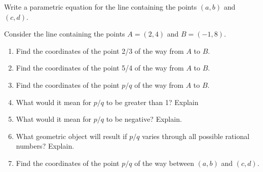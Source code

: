 \begin{prob} Write a parametric equation for the line containing the points $(a,b)$ and $(c,d)$.  

\end{prob}
\begin{prob}  Consider the line containing the points $A=(2, 4)$ and $B=(-1, 8)$.
\begin{enumerate}
\item Find the coordinates of the point 2/3 of the way from $A$ to $B$.  
\item Find the coordinates of the point 5/4 of the way from $A$ to $B$.  
\item Find the coordinates of the point $p/q$ of the way from $A$ to $B$.  
\item What would it mean for $p/q$ to be greater than 1?  Explain
\item What would it mean for $p/q$ to be negative?  Explain.  
\item What geometric object will result if $p/q$ varies through all possible rational numbers?  Explain.   
\item  Find the coordinates of the point $p/q$ of the way between $(a, b)$ and $(c, d)$.  
\end{enumerate}

\end{prob}

%
%

